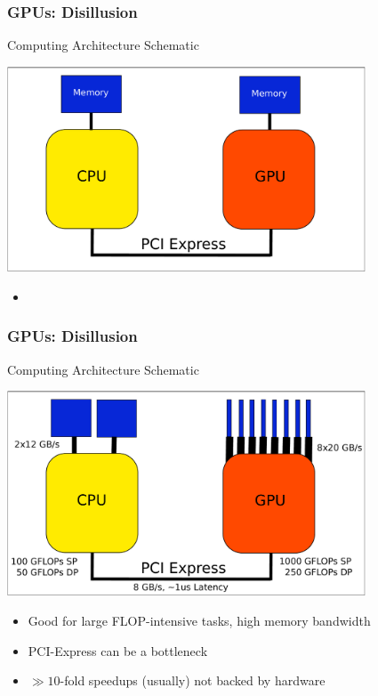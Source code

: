 \begin{frame}[fragile]
\frametitle{GPUs: Disillusion}
 \begin{block}{Computing Architecture Schematic}
  \begin{center}
   \includegraphics[width=0.8\textwidth]{figures/cpu-gpu-coarse.pdf}
  \end{center}

 
 \begin{itemize}
  \item \vspace*{1.03cm}
 \end{itemize}
 \end{block}

\end{frame}

\begin{frame}[fragile]
\frametitle{GPUs: Disillusion}
 \begin{block}{Computing Architecture Schematic}
  \begin{center}
   \includegraphics[width=0.8\textwidth]{figures/cpu-gpu-detail.pdf}
  \end{center}

 \begin{itemize}
  \item Good for large FLOP-intensive tasks, high memory bandwidth
  \item PCI-Express can be a bottleneck
  \item $\gg 10$-fold speedups (usually) not backed by hardware
 \end{itemize}
 \end{block}

\end{frame}

